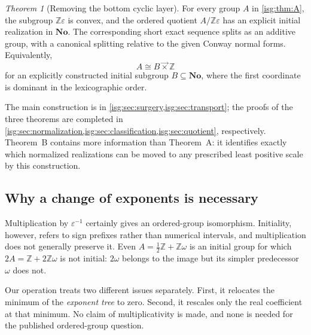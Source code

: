 \documentclass[11pt]{article}
\theoremstyle{definition}
\theoremstyle{remark}
\newtheorem{maintheorem}{Theorem}
\newcommand{\No}{\ensuremath{\mathbf{No}}}
\newcommand{\Z}{\mathbb{Z}}
\newcommand{\lex}{\mathbin{\overrightarrow{\times}}}
\begin{document}
\begin{maintheorem}[Removing the bottom cyclic layer]\label{isg:thm:C}
For every group $A$ in \cref{isg:thm:A}, the subgroup $\Z\varepsilon$ is
convex, and the ordered quotient $A/\Z\varepsilon$ has an explicit
initial realization in $\No$. The corresponding short exact sequence
splits as an additive group, with a canonical splitting relative to the
given Conway normal forms. Equivalently,
\[
 A\cong B\lex\Z
\]
for an explicitly constructed initial subgroup $B\subseteq\No$, where
the first coordinate is dominant in the lexicographic order.
\end{maintheorem}

The main construction is in \cref{isg:sec:surgery,isg:sec:transport}; the proofs
of the three theorems are completed in
\cref{isg:sec:normalization,isg:sec:classification,isg:sec:quotient}, respectively.
Theorem~B contains more information than Theorem~A: it identifies exactly
which normalized realizations can be moved to any prescribed least
positive scale by this construction.

\subsection{Why a change of exponents is necessary}
Multiplication by $\varepsilon^{-1}$ certainly gives an ordered-group
isomorphism. Initiality, however, refers to sign prefixes rather than
numerical intervals, and multiplication does not generally preserve it.
Even $A=\frac12\Z+\Z\omega$ is an initial group for which
$2A=\Z+2\Z\omega$ is not initial: $2\omega$ belongs to the image but
its simpler predecessor $\omega$ does not.

Our operation treats two different issues separately. First, it relocates
the minimum of the \emph{exponent tree} to zero. Second, it rescales only
the real coefficient at that minimum. No claim of multiplicativity is
made, and none is needed for the published ordered-group question.
\end{document}
